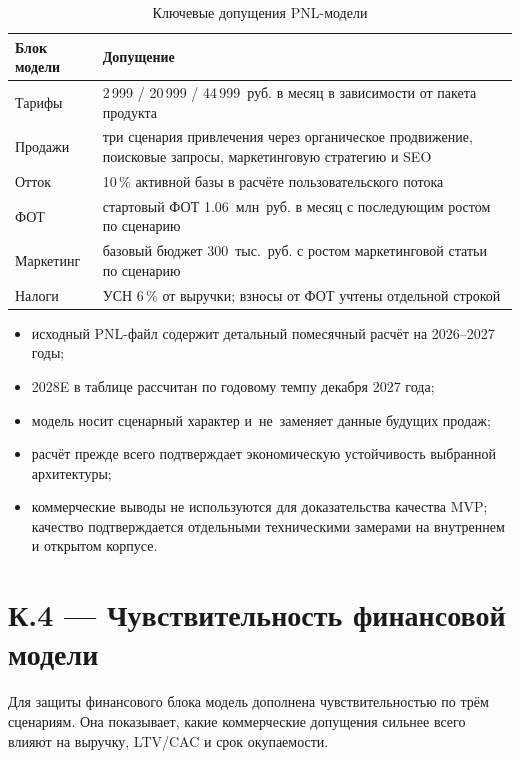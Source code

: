 \begin{table}[H]
  \caption{Ключевые допущения PNL-модели}
  \label{tab:finance-assumptions}
  \centering
  \begingroup
  \small
  \setlength{\tabcolsep}{4pt}
  \begin{tabular}{|P{4.0cm}|P{8.1cm}|}
  \hline
  \textbf{Блок модели} & \textbf{Допущение} \\
  \hline
  Тарифы & 2\,999 / 20\,999 / 44\,999~руб. в месяц в зависимости от пакета продукта \\
  \hline
  Продажи & три сценария привлечения через органическое продвижение, поисковые запросы, маркетинговую стратегию и SEO \\
  \hline
  Отток & 10\,\% активной базы в расчёте пользовательского потока \\
  \hline
  ФОТ & стартовый ФОТ 1.06~млн~руб. в месяц с последующим ростом по сценарию \\
  \hline
  Маркетинг & базовый бюджет 300~тыс.~руб. с ростом маркетинговой статьи по сценарию \\
  \hline
  Налоги & УСН 6\,\% от выручки; взносы от ФОТ учтены отдельной строкой \\
  \hline
  \end{tabular}
  \endgroup
\end{table}

\begin{itemize}
  \item исходный PNL-файл содержит детальный помесячный расчёт на 2026–2027 годы;
  \item 2028E в таблице рассчитан по годовому темпу
    декабря 2027 года;
  \item модель носит сценарный характер и~не~заменяет данные будущих продаж;
  \item расчёт прежде всего подтверждает экономическую устойчивость
    выбранной архитектуры;
  \item коммерческие выводы не используются для доказательства качества MVP;
    качество подтверждается отдельными техническими замерами на внутреннем
    и открытом корпусе.
\end{itemize}

\section*{К.4 — Чувствительность финансовой модели}

Для защиты финансового блока модель дополнена чувствительностью по трём
сценариям. Она показывает, какие коммерческие допущения сильнее всего
влияют на выручку, LTV/CAC и срок окупаемости.

